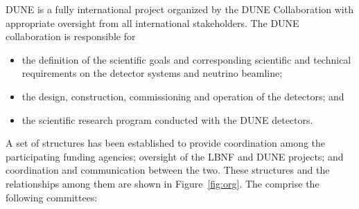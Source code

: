 DUNE is a fully international project
organized by the DUNE Collaboration with appropriate oversight from all international stakeholders.
The DUNE collaboration is responsible for
\begin{itemize}
\item the definition of the scientific goals and corresponding scientific and technical requirements on the detector systems and neutrino beamline;
\item the design, construction, commissioning and operation of the detectors; and
\item the scientific research program conducted with the DUNE detectors. 
\end{itemize}

A set  of  structures  has been established  to  provide
coordination  among  the  participating  funding agencies;
oversight of the LBNF and DUNE projects;
and coordination and communication between the 
two. These structures and the relationships among them are shown 
in Figure~\ref{fig:org}. The comprise the following committees:
